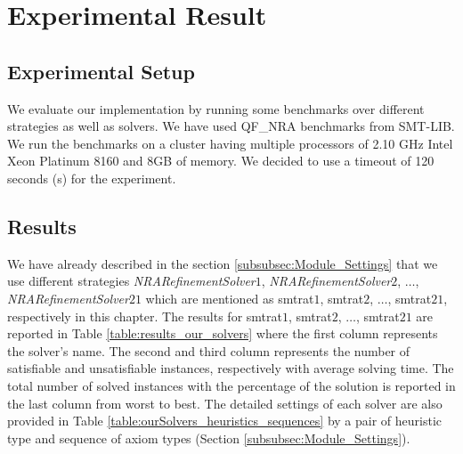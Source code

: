\chapter{Experimental Result}
\label{chap:experimental_result}

\section{Experimental Setup}
We evaluate our implementation by running some benchmarks over different strategies as well as solvers.
We have used QF\_NRA benchmarks from SMT-LIB.
We run the benchmarks on a cluster having multiple processors of 2.10 GHz Intel Xeon Platinum 8160 and 8GB of memory.
We decided to use a timeout of 120 seconds (s) for the experiment.

\section{Results}
We have already described in the section \ref{subsubsec:Module_Settings} that we use different strategies \textit{NRARefinementSolver$1$}, \textit{NRARefinementSolver$2$}, $\dots$, \textit{NRARefinementSolver$21$} which are mentioned as  smtrat$1$, smtrat$2$, $\dots$, smtrat$21$, respectively in this chapter. 
The results for smtrat$1$, smtrat$2$, $\dots$, smtrat$21$ are reported in Table \ref{table:results_our_solvers} where the first column represents the solver's name.
The second and third column represents the number of satisfiable and unsatisfiable instances, respectively with average solving time.
The total number of solved instances with the percentage of the solution is reported in the last column from worst to best.
The detailed settings of each solver are also provided in Table \ref{table:ourSolvers_heuristics_sequences} by a pair of heuristic type and sequence of axiom types (Section \ref{subsubsec:Module_Settings}).\newline

